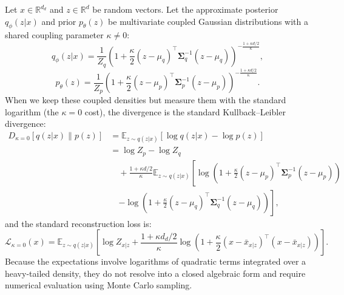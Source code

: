 \documentclass[twoside,11pt]{article}
\begin{document}
\begin{lemma}
\label{lemma:standard_free_energy_coupled_gaussians}
Let $x \in \mathbb{R}^{d_d}$ and $z \in \mathbb{R}^d$ be random vectors. Let the approximate posterior $q_{\phi}(z|x)$ and prior $p_{\theta}(z)$ be multivariate coupled Gaussian distributions with a shared coupling parameter $\kappa \neq 0$:
\begin{equation}
q_{\phi}(z|x) = \frac{1}{Z_{q}} \left( 1 + \frac{\kappa}{2} (z - \mu_q)^\top \boldsymbol{\Sigma}_q^{-1} (z - \mu_q) \right)^{-\frac{1 + \kappa d/2}{\kappa}},
\end{equation}
\begin{equation}
p_{\theta}(z) = \frac{1}{Z_{p}} \left( 1 + \frac{\kappa}{2} (z - \mu_p)^\top \boldsymbol{\Sigma}_p^{-1} (z - \mu_p) \right)^{-\frac{1 + \kappa d/2}{\kappa}}.
\end{equation}
When we keep these coupled densities but measure them with the standard logarithm (the $\kappa = 0$ cost), the divergence is the standard Kullback--Leibler divergence:
\begin{equation}
\begin{aligned}
D_{\kappa=0}[q(z|x) \parallel p(z)] &= \mathbb{E}_{z \sim q(z|x)} \left[ \log q(z|x) - \log p(z) \right] \\
&= \log Z_p - \log Z_q \\
&\quad + \frac{1 + \kappa d/2}{\kappa} \mathbb{E}_{z \sim q(z|x)} \left[ \log \left( 1 + \frac{\kappa}{2} (z - \mu_p)^\top \boldsymbol{\Sigma}_p^{-1} (z - \mu_p) \right) \right. \\
&\quad \left. - \log \left( 1 + \frac{\kappa}{2} (z - \mu_q)^\top \boldsymbol{\Sigma}_q^{-1} (z - \mu_q) \right) \right],
\end{aligned}
\end{equation}
and the standard reconstruction loss is:
\begin{equation}
\mathcal{L}_{\kappa=0}(x) = \mathbb{E}_{z \sim q(z|x)} \left[ \log Z_{x|z} + \frac{1 + \kappa d_d/2}{\kappa} \log \left( 1 + \frac{\kappa}{2} (x - \bar{x}_{x|z})^\top (x - \bar{x}_{x|z}) \right) \right].
\end{equation}
Because the expectations involve logarithms of quadratic terms integrated over a heavy-tailed density, they do not resolve into a closed algebraic form and require numerical evaluation using Monte Carlo sampling.
\end{lemma}
\end{document}
